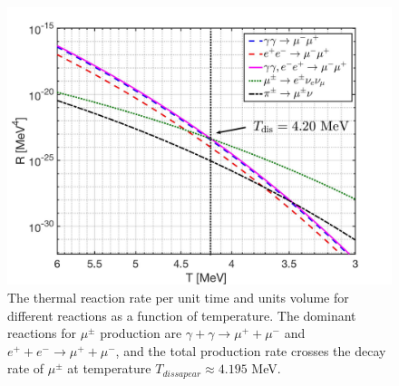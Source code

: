 \begin{figure}[ht]
\begin{center}
\includegraphics[width=5.0in]{./plots/MuonRate_new2.jpg}
\caption{The thermal reaction rate per unit time and units volume for different reactions as a function of temperature. The dominant reactions for $\mu^\pm$ production are ${\gamma+\gamma\to\mu^++\mu^-}$ and $e^++e^-\to\mu^++\mu^-$, and the total production rate crosses the decay rate of $\mu^\pm$ at temperature $T_{dissapear}\approx 4.195$ MeV.}
\label{MuonRatenew_fig}
\end{center}
\end{figure}

